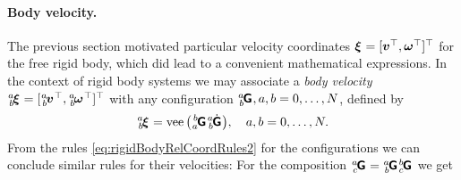 \paragraph{Body velocity.}
The previous section motivated particular velocity coordinates $\bodyVel{}{} = [\v^\top, \w^\top]^\top$ for the free rigid body, which did lead to a convenient mathematical expressions.
In the context of rigid body systems we may associate a \textit{body velocity} $\bodyVel{\BidxI}{\BidxII} = [\bodyLinVel{\BidxI}{\BidxII}^\top, \bodyAngVel{\BidxI}{\BidxII}^\top]^\top$ with any configuration $\bodyHomoCoord{\BidxI}{\BidxII}, \BidxI,\BidxII = 0,\ldots,\numRigidBodies$, defined by 
\begin{align}\label{eq:DefBodyVelocityMulti}
 \bodyVel{\BidxI}{\BidxII} = \veeOp\big(\bodyHomoCoord{\BidxII}{\BidxI} \bodyHomoCoordd{\BidxI}{\BidxII}{}{} \big), \quad \BidxI,\BidxII = 0,\ldots,\numRigidBodies.
\end{align}
From the rules \eqref{eq:rigidBodyRelCoordRules2} for the configurations we can conclude similar rules for their velocities:
For the composition $\bodyHomoCoord{\BidxI}{\BidxIII}{}{} = \bodyHomoCoord{\BidxI}{\BidxII}{}{} \bodyHomoCoord{\BidxII}{\BidxIII}{}{}$ we get
